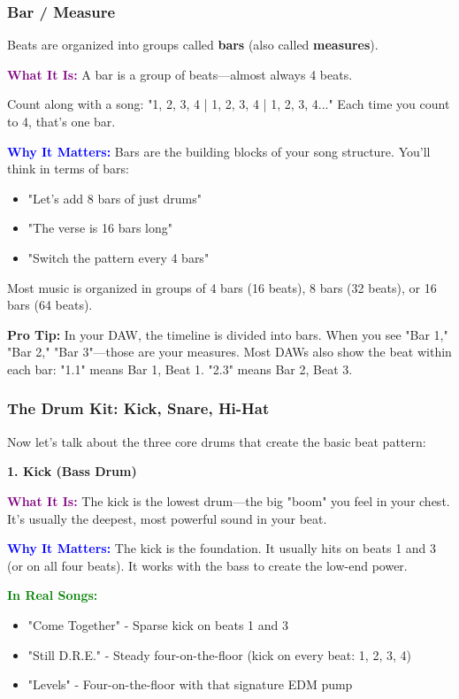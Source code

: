 \documentclass[11pt,letterpaper]{article}
\newcommand{\purple}[1]{\textcolor{purple}{\textbf{#1}}}
\newcommand{\bluepurple}[1]{\textcolor{blue}{\textbf{#1}}}
\newcommand{\greentext}[1]{\textcolor{green}{\textbf{#1}}}
\begin{document}
\subsubsection{Bar / Measure}

Beats are organized into groups called \textbf{bars} (also called \textbf{measures}).

\textbf{\purple{What It Is:}} A bar is a group of beats—almost always 4 beats. 

Count along with a song: "1, 2, 3, 4 | 1, 2, 3, 4 | 1, 2, 3, 4..." Each time you count to 4, that's one bar.

\textbf{\bluepurple{Why It Matters:}} Bars are the building blocks of your song structure. You'll think in terms of bars:
\begin{itemize}[leftmargin=*]
\item "Let's add 8 bars of just drums"
\item "The verse is 16 bars long"
\item "Switch the pattern every 4 bars"
\end{itemize}

Most music is organized in groups of 4 bars (16 beats), 8 bars (32 beats), or 16 bars (64 beats).

\begin{tcolorbox}[colback=lightgray,colframe=purple,width=\textwidth,arc=3mm,boxrule=1pt]
\textbf{Pro Tip:} In your DAW, the timeline is divided into bars. When you see "Bar 1," "Bar 2," "Bar 3"—those are your measures. Most DAWs also show the beat within each bar: "1.1" means Bar 1, Beat 1. "2.3" means Bar 2, Beat 3.
\end{tcolorbox}

\subsubsection{The Drum Kit: Kick, Snare, Hi-Hat}

Now let's talk about the three core drums that create the basic beat pattern:

\textbf{1. Kick (Bass Drum)}

\textbf{\purple{What It Is:}} The kick is the lowest drum—the big "boom" you feel in your chest. It's usually the deepest, most powerful sound in your beat.

\textbf{\bluepurple{Why It Matters:}} The kick is the foundation. It usually hits on beats 1 and 3 (or on all four beats). It works with the bass to create the low-end power.

\textbf{\greentext{In Real Songs:}}
\begin{itemize}[leftmargin=*]
\item "Come Together" - Sparse kick on beats 1 and 3
\item "Still D.R.E." - Steady four-on-the-floor (kick on every beat: 1, 2, 3, 4)
\item "Levels" - Four-on-the-floor with that signature EDM pump
\end{itemize}
\end{document}
